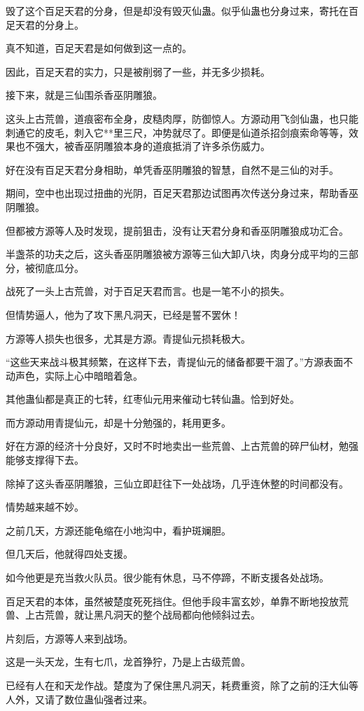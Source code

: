 \begin{this_body}
毁了这个百足天君的分身，但是却没有毁灭仙蛊。似乎仙蛊也分身过来，寄托在百足天君的分身上。

真不知道，百足天君是如何做到这一点的。

因此，百足天君的实力，只是被削弱了一些，并无多少损耗。

接下来，就是三仙围杀香巫阴雕狼。

这头上古荒兽，道痕密布全身，皮糙肉厚，防御惊人。方源动用飞剑仙蛊，也只能刺通它的皮毛，刺入它**里三尺，冲势就尽了。即便是仙道杀招剑痕索命等等，效果也不强大，被香巫阴雕狼本身的道痕抵消了许多杀伤威力。

好在没有百足天君分身相助，单凭香巫阴雕狼的智慧，自然不是三仙的对手。

期间，空中也出现过扭曲的光阴，百足天君那边试图再次传送分身过来，帮助香巫阴雕狼。

但都被方源等人及时发现，提前狙击，没有让天君分身和香巫阴雕狼成功汇合。

半盏茶的功夫之后，这头香巫阴雕狼被方源等三仙大卸八块，肉身分成平均的三部分，被彻底瓜分。

战死了一头上古荒兽，对于百足天君而言。也是一笔不小的损失。

但情势逼人，他为了攻下黑凡洞天，已经是誓不罢休！

方源等人损失也很多，尤其是方源。青提仙元损耗极大。

“这些天来战斗极其频繁，在这样下去，青提仙元的储备都要干涸了。”方源表面不动声色，实际上心中暗暗着急。

其他蛊仙都是真正的七转，红枣仙元用来催动七转仙蛊。恰到好处。

而方源动用青提仙元，却是十分勉强的，耗用更多。

好在方源的经济十分良好，又时不时地卖出一些荒兽、上古荒兽的碎尸仙材，勉强能够支撑得下去。

除掉了这头香巫阴雕狼，三仙立即赶往下一处战场，几乎连休整的时间都没有。

情势越来越不妙。

之前几天，方源还能龟缩在小地沟中，看护斑斓胆。

但几天后，他就得四处支援。

如今他更是充当救火队员。很少能有休息，马不停蹄，不断支援各处战场。

百足天君的本体，虽然被楚度死死挡住。但他手段丰富玄妙，单靠不断地投放荒兽、上古荒兽，就让黑凡洞天的整个战局都向他倾斜过去。

片刻后，方源等人来到战场。

这是一头天龙，生有七爪，龙首狰狞，乃是上古级荒兽。

已经有人在和天龙作战。楚度为了保住黑凡洞天，耗费重资，除了之前的汪大仙等人外，又请了数位蛊仙强者过来。


\end{this_body}
